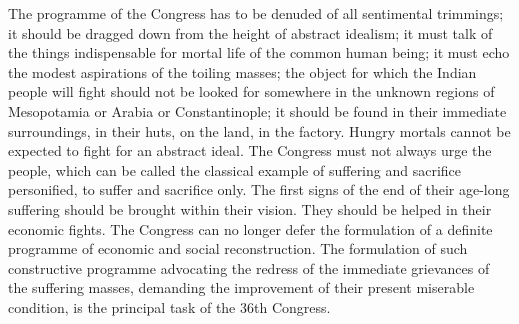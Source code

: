 The programme of the Congress has to be denuded of all sentimental trimmings; it should be dragged down from the height of abstract idealism; it must talk of the things indispensable for mortal life of the common human being; it must echo the modest aspirations of the toiling masses; 
the object for which the Indian people will fight should not be looked for somewhere in the unknown regions of Mesopotamia or Arabia or Constantinople; it should be found in their immediate surroundings, in their huts, on the land, in the factory. Hungry mortals cannot be expected to fight for an abstract ideal. The Congress must not always urge the people, which can be called the classical example of suffering and sacrifice personified, to suffer and sacrifice only. The first signs of the end of their age-long suffering should be brought within their vision. They should be helped in their economic fights. The Congress can no longer defer the formulation of a definite programme of economic 
and social reconstruction. The formulation of such constructive programme advocating the redress of the immediate grievances of the suffering masses, demanding the improvement of their present miserable condition, is the principal task of the 36th Congress. 

